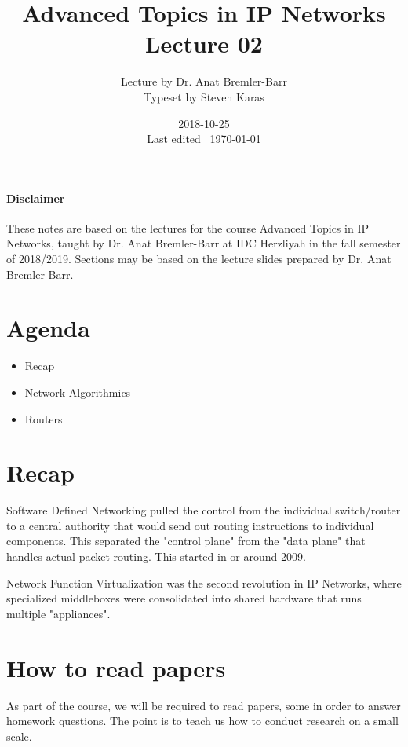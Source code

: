 \documentclass{idc_msc}
\title{Advanced Topics in IP Networks \\\large Lecture 02}
\date{2018-10-25 \\ Last edited \currenttime\ \today}
\author{Lecture by Dr. Anat Bremler-Barr\\Typeset by Steven Karas}
\begin{document}
\maketitle

\paragraph{Disclaimer}

These notes are based on the lectures for the course Advanced Topics in IP Networks, taught by Dr. Anat Bremler-Barr at IDC Herzliyah in the fall semester of 2018/2019.
Sections may be based on the lecture slides prepared by Dr. Anat Bremler-Barr.

\nocite{Varghese:2004:NAI:1203994}
\nocite{Crovella:2006:IMI:1196480}
\nocite{Kurose:2002:CNT:549735}

\section{Agenda}

\begin{itemize}
  \item Recap
  \item Network Algorithmics
  \item Routers
\end{itemize}

\section{Recap}

Software Defined Networking pulled the control from the individual switch/router to a central authority that would send out routing instructions to individual components.
This separated the "control plane" from the "data plane" that handles actual packet routing.
This started in or around 2009.

Network Function Virtualization was the second revolution in IP Networks, where specialized middleboxes were consolidated into shared hardware that runs multiple "appliances".

\section{How to read papers}

As part of the course, we will be required to read papers, some in order to answer homework questions.
The point is to teach us how to conduct research on a small scale.
\end{document}
